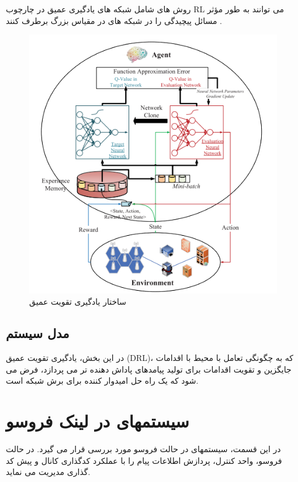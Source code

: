   روش های  شامل شبکه های یادگیری عمیق در چارچوب RL می توانند به طور مؤثر مسائل پیچیدگی را در شبکه های در مقیاس بزرگ برطرف کنند
  \cite{aiNS}.
  \begin{figure}%
  \centering
    \includegraphics[width=\linewidth]{./fig/dlNS}
  \caption{ساختار یادگیری تقویت عمیق\cite{drl}}
  \label{fig:drl}
\end{figure}
\subsection{مدل سیستم}
در این بخش، یادگیری تقویت عمیق (DRL)، که به چگونگی تعامل با محیط با اقدامات جایگزین و تقویت اقدامات برای تولید پیامدهای پاداش دهنده تر می پردازد، فرض می شود که یک راه حل امیدوار کننده برای برش شبکه است\cite{drl}.

 
 \section{ سیستمهای   در لینک فروسو }
در این قسمت، سیستمهای   در حالت فروسو مورد بررسی قرار می گیرد. در حالت فروسو،  واحد کنترل، پردازش اطلاعات پیام را با عملکرد کدگذاری کانال و پیش کد گذاری  مدیریت می نماید.
